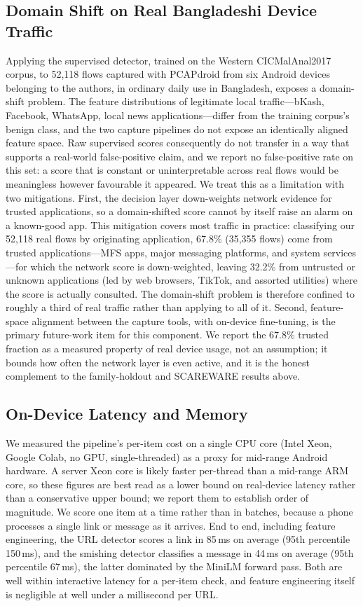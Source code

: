 \documentclass[manuscript,screen,review]{acmart}
\begin{document}
\subsection{Domain Shift on Real Bangladeshi Device Traffic}
Applying the supervised detector, trained on the Western CICMalAnal2017 corpus, to 52{,}118 flows captured with PCAPdroid from six Android devices belonging to the authors, in ordinary daily use in Bangladesh, exposes a domain-shift problem. The feature distributions of legitimate local traffic---bKash, Facebook, WhatsApp, local news applications---differ from the training corpus's benign class, and the two capture pipelines do not expose an identically aligned feature space. Raw supervised scores consequently do not transfer in a way that supports a real-world false-positive claim, and we report no false-positive rate on this set: a score that is constant or uninterpretable across real flows would be meaningless however favourable it appeared. We treat this as a limitation with two mitigations. First, the decision layer down-weights network evidence for trusted applications, so a domain-shifted score cannot by itself raise an alarm on a known-good app. This mitigation covers most traffic in practice: classifying our 52{,}118 real flows by originating application, 67.8\% (35{,}355 flows) come from trusted applications---MFS apps, major messaging platforms, and system services---for which the network score is down-weighted, leaving 32.2\% from untrusted or unknown applications (led by web browsers, TikTok, and assorted utilities) where the score is actually consulted. The domain-shift problem is therefore confined to roughly a third of real traffic rather than applying to all of it. Second, feature-space alignment between the capture tools, with on-device fine-tuning, is the primary future-work item for this component. We report the 67.8\% trusted fraction as a measured property of real device usage, not an assumption; it bounds how often the network layer is even active, and it is the honest complement to the family-holdout and SCAREWARE results above.

\subsection{On-Device Latency and Memory}
We measured the pipeline's per-item cost on a single CPU core (Intel Xeon, Google Colab, no GPU, single-threaded) as a proxy for mid-range Android hardware. A server Xeon core is likely faster per-thread than a mid-range ARM core, so these figures are best read as a lower bound on real-device latency rather than a conservative upper bound; we report them to establish order of magnitude. We score one item at a time rather than in batches, because a phone processes a single link or message as it arrives. End to end, including feature engineering, the URL detector scores a link in 85\,ms on average (95th percentile 150\,ms), and the smishing detector classifies a message in 44\,ms on average (95th percentile 67\,ms), the latter dominated by the MiniLM forward pass. Both are well within interactive latency for a per-item check, and feature engineering itself is negligible at well under a millisecond per URL.
\end{document}
